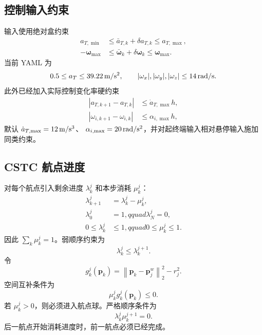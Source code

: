 \documentclass[UTF8,a4paper,11pt]{ctexart}
\newcommand{\normtwo}[1]{\left\lVert#1\right\rVert_2}
\begin{document}
\subsection{控制输入约束}

输入使用绝对盒约束
\begin{align}
 a_{T,\min}&\leq \bar a_{T,k}+\delta a_{T,k}\leq a_{T,\max},\\
 -\bm\omega_{\max}&\leq
 \bar{\bm\omega}_k+\delta\bm\omega_k\leq\bm\omega_{\max}.
\end{align}
当前 YAML 为
\begin{equation}
 0.5\leq a_T\leq39.22\,{\rm m/s^2},\qquad
 |\omega_x|,|\omega_y|,|\omega_z|\leq14\,{\rm rad/s}.
\end{equation}
此外已经加入实际控制变化率硬约束
\begin{align}
 |a_{T,k+1}-a_{T,k}|&\leq\dot a_{T,\max}h,\\
 |\omega_{i,k+1}-\omega_{i,k}|&\leq\alpha_{i,\max}h,
\end{align}
默认 $\dot a_{T,\max}=12\,{\rm m/s^3}$、
$\alpha_{i,\max}=20\,{\rm rad/s^2}$，并对起终端输入相对悬停输入施加同类约束。

\subsection{CSTC 航点进度}

对每个航点引入剩余进度 $\lambda_k^j$ 和本步消耗 $\mu_k^j$：
\begin{align}
 \lambda_{k+1}^j&=\lambda_k^j-\mu_k^j,\\
 \lambda_0^j&=1,qquad \lambda_N^j=0,\\
 0\leq\lambda_k^j&\leq1,qquad0\leq\mu_k^j\leq1.
 \label{eq:progress}
\end{align}
因此 $\sum_k\mu_k^j=1$。弱顺序约束为
\begin{equation}
 \lambda_k^j\leq\lambda_k^{j+1}.
\end{equation}
令
\begin{equation}
 g_k^j(\bm p_k)=\normtwo{\bm p_k-\bm p_j^w}^2-r_j^2.
\end{equation}
空间互补条件为
\begin{equation}
 \mu_k^j g_k^j(\bm p_k)\leq0.
 \label{eq:spatial-cstc}
\end{equation}
若 $\mu_k^j>0$，则必须进入航点球。严格顺序条件为
\begin{equation}
 \lambda_k^j\mu_k^{j+1}=0.
 \label{eq:order-cstc}
\end{equation}
后一航点开始消耗进度时，前一航点必须已经完成。
\end{document}
